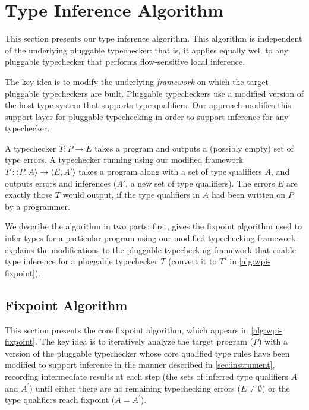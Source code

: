 \section{Type Inference Algorithm}
\label{sec:algorithm}

This section presents our type inference algorithm. This algorithm is
independent of the underlying pluggable typechecker: that is,
it applies equally well to any pluggable typechecker that performs flow-sensitive
local inference.


The key idea is to modify the underlying \emph{framework}
on which the target pluggable typecheckers are built. Pluggable
typecheckers use a modified version of the host type system
that supports type qualifiers. Our approach modifies this support
layer for pluggable typechecking in order to support inference for
any typechecker.

A typechecker $T : P \rightarrow E$
takes a program and outputs a (possibly empty) set of
type errors.  A typechecker running using our modified framework
$T' : \langle P, A \rangle \rightarrow \langle E, A' \rangle$
takes a program along with a set of type qualifiers $A$, and outputs errors and
inferences (\ie $A'$, a new set of type qualifiers).
The errors $E$ are exactly those $T$ would output, if the
type qualifiers in $A$ had been written on $P$ by a programmer.

We describe the algorithm in two parts: first,
 gives the fixpoint
algorithm used to infer types for a particular program
using our modified typechecking framework.
 explains the modifications to the pluggable
typechecking framework that enable type inference for a pluggable
typechecker $T$ (\ie convert it to $T'$ in \cref{alg:wpi-fixpoint}).


\subsection{Fixpoint Algorithm}
\label{sec:core-algorithm}



This section presents the core fixpoint algorithm, which appears
in \cref{alg:wpi-fixpoint}. The key idea is to iteratively analyze
the target program ($P$) with a version of the
pluggable typechecker whose core qualified type rules
have been modified to support inference in the manner described in
\cref{sec:instrument}, recording intermediate results at each
step (the sets of inferred type qualifiers $A$ and $A^{\prime}$) until
either there are no remaining typechecking errors
(\ie $E \neq \emptyset$)
or the
type qualifiers reach fixpoint (\ie $A = A^{\prime}$).

